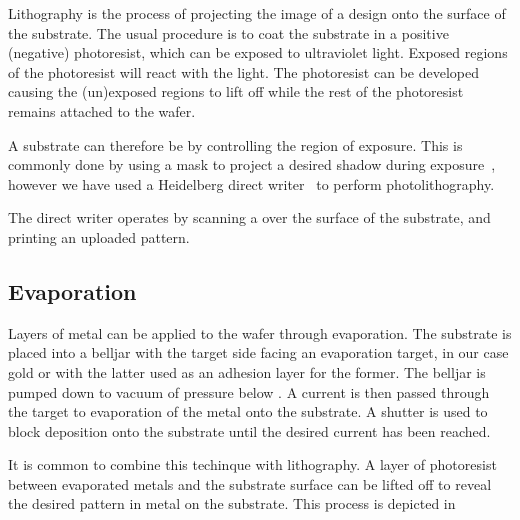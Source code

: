 Lithography is the process of projecting the image of a design onto the surface
of the substrate. The usual procedure is to coat the substrate in a positive
(negative)  photoresist, which can be exposed to ultraviolet
light. Exposed regions of the photoresist will react with the light. The
photoresist can be developed causing the (un)exposed regions to lift off while
the rest of the photoresist remains attached to the wafer.

A substrate can therefore be  by controlling the region of
exposure. This is commonly done by using a mask to project a desired shadow
during exposure~\cite{}, however we have used a Heidelberg direct
writer~\cite{} to perform photolithography.

The direct writer operates by scanning a  over the surface of the
substrate, and printing an uploaded pattern.


\subsection{Evaporation}

Layers of metal can be applied to the wafer through evaporation. The substrate
is placed into a belljar 
with the target side facing an evaporation target, in our case gold or
 with the latter used as an adhesion layer for the former. The
belljar is pumped down to vacuum of pressure below . A current is then
passed through the target to  evaporation of the metal onto the
substrate. A shutter is used to block deposition onto the substrate until the
desired current has been reached.

It is common to combine this techinque with lithography. A layer of photoresist
between evaporated metals and the substrate surface can be lifted off to reveal
the desired pattern in metal on the substrate.  This process is
depicted in 

\begin{figure}
  \caption{}
  \label{fab:fig:photolith}
\end{figure}


